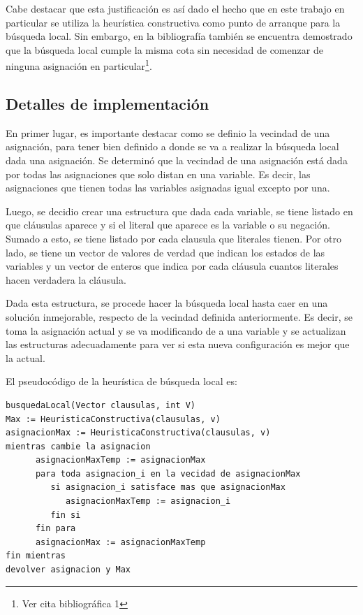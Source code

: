 \documentclass[a4paper,10pt]{article}
\begin{document}
Cabe destacar que esta justificaci\'on es as\'i dado el hecho que en este trabajo en particular se utiliza la heur\'istica constructiva como punto de arranque para la b\'usqueda local. Sin embargo, en la bibliograf\'ia tambi\'en se encuentra demostrado que la b\'usqueda local cumple la misma cota sin necesidad de comenzar de ninguna asignaci\'on en particular\footnote{Ver cita bibliogr\'afica 1}.


\subsection*{Detalles de implementaci\'on}

En primer lugar, es importante destacar como se definio la vecindad de una asignaci\'on, para tener bien definido a donde se va a realizar la b\'usqueda local dada una asignaci\'on. Se determin\'o que la vecindad de una asignaci\'on est\'a dada por todas las asignaciones que solo distan en una variable. Es decir, las asignaciones que tienen todas las variables asignadas igual excepto por una.

Luego, se decidio crear una estructura que dada cada variable, se tiene listado en que cl\'ausulas aparece y si el literal que aparece es la variable o su negaci\'on. Sumado a esto, se tiene listado por cada clausula que literales tienen. Por otro lado, se tiene un vector de valores de verdad que indican los estados de las variables y un vector de enteros que indica por cada cl\'ausula cuantos literales hacen verdadera la cl\'ausula.

Dada esta estructura, se procede hacer la b\'usqueda local hasta caer en una soluci\'on inmejorable, respecto de la vecindad definida anteriormente. Es decir, se toma la asignaci\'on actual y se va modificando de a una variable y se actualizan las estructuras adecuadamente para ver si esta nueva configuraci\'on es mejor que la actual. 

El pseudoc\'odigo de la heur\'istica de b\'usqueda local es:

\begin{verbatim}
busquedaLocal(Vector clausulas, int V)
Max := HeuristicaConstructiva(clausulas, v)
asignacionMax := HeuristicaConstructiva(clausulas, v)
mientras cambie la asignacion
      asignacionMaxTemp := asignacionMax
      para toda asignacion_i en la vecidad de asignacionMax
         si asignacion_i satisface mas que asignacionMax
            asignacionMaxTemp := asignacion_i
         fin si
      fin para
      asignacionMax := asignacionMaxTemp
fin mientras
devolver asignacion y Max
\end{verbatim}
\end{document}
